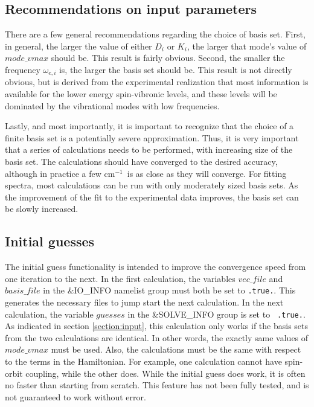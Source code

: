 \documentclass{article}
\newcommand{\wn}{cm$^{-1}$}
\begin{document}
\subsection{Recommendations on input parameters}
There are a few general recommendations regarding the choice of basis
set. First, in general, the larger the value of either $D_i$ or $K_i$,
the larger that mode's value of $mode\_vmax$ should be. This result is
fairly obvious. Second, the smaller the frequency $\omega _{e,i}$ is,
the larger the basis set should be. This result is not directly
obvious, but is derived from the experimental realization that most
information is available for the lower energy spin-vibronic levels,
and these levels will be dominated by the vibrational modes with low
frequencies. 

Lastly, and most importantly, it is important to recognize that the
choice of a finite basis set is a potentially severe
approximation. Thus, it is very important that a series of
calculations needs to be performed, with increasing size of the basis
set. The calculations should have converged to the desired accuracy,
although in practice a few \wn \ is as close as they will
converge. For fitting spectra, most calculations can be run with only
moderately sized basis sets. As the improvement of the fit to the
experimental data improves, the basis set can be slowly increased.

\subsection{Initial guesses}
The initial guess functionality is intended to improve the convergence
speed from one iteration to the next. In the first calculation, the
variables $vec\_file$ and $basis\_file$ in the \&IO\_INFO namelist
group must both be set to {\tt .true.}. This generates the necessary
files to jump start the next calculation. In the next calculation, the
variable $guesses$ in the \&SOLVE\_INFO group is set to {\tt
  .true.}. As indicated in section \ref{section:input}, this
calculation only works if the basis sets from the two calculations are
identical. In other words, the exactly same values of $mode\_vmax$
must be used. Also, the calculations must be the same with respect to
the terms in the Hamiltonian. For example, one calculation cannot have
spin-orbit coupling, while the other does. While the initial guess
does work, it is often no faster than starting from scratch. This
feature has not been fully tested, and is not guaranteed to work
without error.
\end{document}
